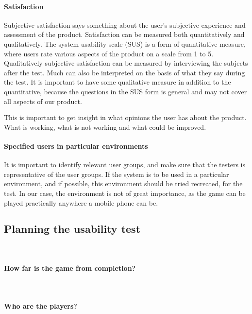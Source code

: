\paragraph{Satisfaction}

Subjective satisfaction says something about the user's subjective experience and assessment of the product. Satisfaction can be measured both quantitatively and qualitatively. The system usability scale (SUS) is a form of quantitative measure, where users rate various aspects of the product on a scale from 1 to 5. Qualitatively subjective satisfaction can be measured by interviewing the subjects after the test. Much can also be interpreted on the basis of what they say during the test. It is important to have some qualitative measure in addition to the quantitative, because the questions in the SUS form is general and may not cover all aspects of our product.

This is important to get insight in what opinions the user has about the product. What is working, what is not working and what could be improved.

\paragraph{Specified users in particular environments}

It is important to identify relevant user groups, and make sure that the testers is representative of the user groups. If the system is to be used in a particular environment, and if possible, this environment should be tried recreated, for the test. In our case, the environment is not of great importance, as the game can be played practically anywhere a mobile phone can be.

\subsection{Planning the usability test}\mbox{}\\

\paragraph{How far is the game from completion?}\mbox{}\\



\paragraph{Who are the players?}\mbox{}\\

